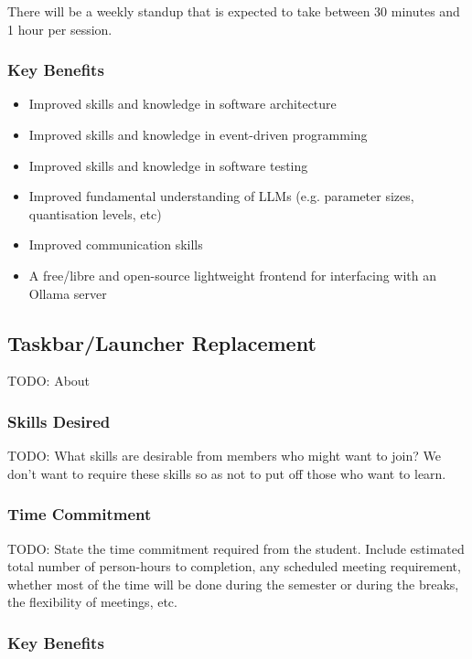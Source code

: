 \documentclass[11pt,fleqn]{article}
\begin{document}
There will be a weekly standup that is expected to take between 30 minutes and 1 hour per session.

\subsubsection*{Key Benefits}

\begin{itemize}
    \item Improved skills and knowledge in software architecture
    \item Improved skills and knowledge in event-driven programming
    \item Improved skills and knowledge in software testing
    \item Improved fundamental understanding of LLMs (e.g. parameter sizes, quantisation levels, etc)
    \item Improved communication skills
    \item A free/libre and open-source lightweight frontend for interfacing with an Ollama server
\end{itemize}

\subsection{Taskbar/Launcher Replacement}

TODO: About

\subsubsection*{Skills Desired}

TODO: What skills are desirable from members who might want to join?  We don't want to require these skills so as not to put off those who want to learn.

\subsubsection*{Time Commitment}

TODO: State the time commitment required from the student.  Include estimated total number of person-hours to completion, any scheduled meeting requirement, whether most of the time will be done during the semester or during the breaks, the flexibility of meetings, etc.

\subsubsection*{Key Benefits}
\end{document}
